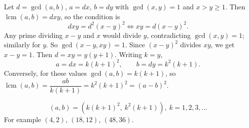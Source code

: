 Let \(d=\gcd(a,b)\), \(a=dx\), \(b=dy\) with \(\gcd(x,y)=1\) and \(x>y\ge1\). Then \(\operatorname{lcm}(a,b)=dxy\), so the condition is
\[
dxy=d^2(x-y)^2\iff xy=d(x-y)^2 .
\]
Any prime dividing \(x-y\) and \(x\) would divide \(y\), contradicting \(\gcd(x,y)=1\); similarly for \(y\). So \(\gcd(x-y,xy)=1\). Since \((x-y)^2\) divides \(xy\), we get \(x-y=1\). Then \(d=xy=y(y+1)\). Writing \(k=y\),
\[
a=dx=k(k+1)^2,\qquad b=dy=k^2(k+1).
\]
Conversely, for these values \(\gcd(a,b)=k(k+1)\), so \(\operatorname{lcm}(a,b)=\dfrac{ab}{k(k+1)}=k^2(k+1)^2=(a-b)^2\).

\[
\boxed{(a,b)=\left(k(k+1)^2,\ k^2(k+1)\right),\ k=1,2,3,\dots}
\]
For example \((4,2)\), \((18,12)\), \((48,36)\).
